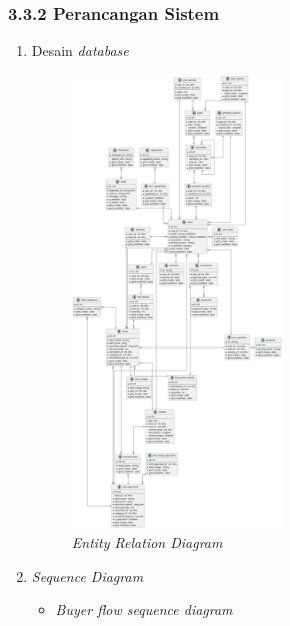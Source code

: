 \documentclass[a4paper]{article}
\begin{document}
\subsubsection*{3.3.2 Perancangan Sistem}
\begin{enumerate}
    \item Desain \textit{database}\\
    \begin{figure}[h]
        \includegraphics[height=12cm,keepaspectratio]{erd diagram.png}
        \centering
        \caption{\textit{Entity Relation Diagram}}
    \end{figure}
    \newpage
    \item \textit{Sequence Diagram}\\
    \begin{itemize}
        \item \textit{Buyer flow sequence diagram}\\
            \begin{figure}[h]

\end{figure}
\end{itemize}
\end{enumerate}
\end{document}
